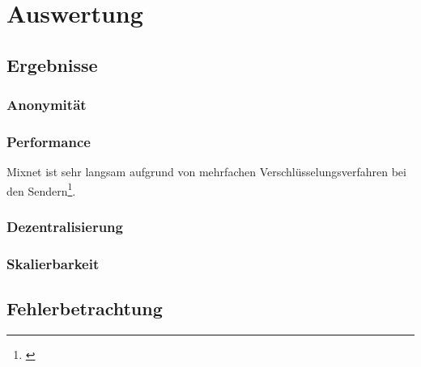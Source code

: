 \section{Auswertung}

\subsection{Ergebnisse}

\subsubsection{Anonymität}

\subsubsection{Performance}

Mixnet ist sehr langsam aufgrund von mehrfachen Verschlüsselungsverfahren bei den Sendern\footnote{\cite{EffectivenessOfMixnets}}.

\subsubsection{Dezentralisierung}

\subsubsection{Skalierbarkeit}

\subsection{Fehlerbetrachtung}